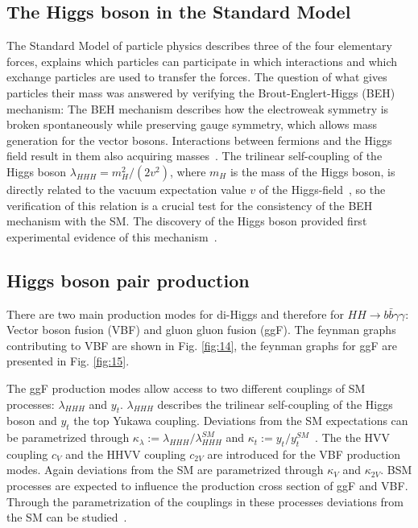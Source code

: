 \label{sec:theory}

\subsection{The Higgs boson in the Standard Model}

The Standard Model of particle physics describes three of the four elementary forces, explains which particles can participate in which interactions and which exchange particles are
used to transfer the forces. The question of what gives particles their mass was answered by verifying the Brout-Englert-Higgs (BEH) mechanism: The BEH mechanism describes how the electroweak symmetry
is broken spontaneously while preserving gauge symmetry, which allows mass generation for the vector bosons. Interactions between fermions and the Higgs field result in them also acquiring masses~\cite{Guerrero:2021}. The trilinear self-coupling of the Higgs boson
 $\lambda_{HHH} = m_H^2/(2v^2)$, where $m_H$ is the mass of the Higgs boson, is directly related
to the vacuum expectation value $v$ of the Higgs-field~\cite{HandbookLHC}, so the verification of this relation is a crucial test for the consistency of the BEH mechanism with the SM. 
The discovery of the Higgs boson provided first experimental evidence of this mechanism~\cite{Guerrero:2021}.\\

\subsection{Higgs boson pair production}
\label{sec:sig_processes}

There are two main production modes for di-Higgs and therefore for $HH \rightarrow b \bar{b} \gamma \gamma$: Vector boson fusion (VBF) and gluon gluon fusion (ggF). 
The feynman graphs contributing to VBF are shown in Fig. \ref{fig:14}, the feynman graphs for ggF are presented in Fig. \ref{fig:15}. \\


The ggF production modes allow access to two different couplings of SM processes: $\lambda_{HHH}$ and $y_t$.
$\lambda_{HHH}$ describes the trilinear self-coupling of the Higgs boson and $y_t$ the top Yukawa coupling. 
Deviations from the SM expectations
can be parametrized through $\kappa_{\lambda} := \lambda_{HHH}/\lambda_{HHH}^{SM}$ and $\kappa_{t} := y_{t}/y_{t}^{SM}$~\cite{CMS:2021qbp}. 
The the HVV coupling $c_V$ and the HHVV coupling $c_{2V}$ are introduced for the VBF production modes. Again deviations from the SM are parametrized through $\kappa_V$ and $\kappa_{2V}$.
BSM processes are expected to influence the production cross section of ggF and VBF. Through the parametrization of the couplings in these processes deviations from the SM can be studied~\cite{CMS:2022Higgs}.

